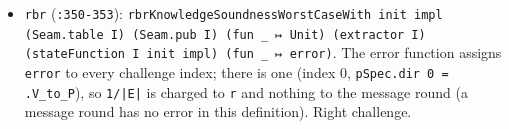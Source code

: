 \begin{itemize}
\item \texttt{rbr} (\texttt{:350-{}353}): \texttt{r\allowbreak{}b\allowbreak{}r\allowbreak{}K\allowbreak{}n\allowbreak{}o\allowbreak{}w\allowbreak{}l\allowbreak{}e\allowbreak{}d\allowbreak{}g\allowbreak{}e\allowbreak{}S\allowbreak{}o\allowbreak{}u\allowbreak{}n\allowbreak{}d\allowbreak{}n\allowbreak{}e\allowbreak{}s\allowbreak{}s\allowbreak{}W\allowbreak{}o\allowbreak{}r\allowbreak{}s\allowbreak{}t\allowbreak{}C\allowbreak{}a\allowbreak{}s\allowbreak{}e\allowbreak{}W\allowbreak{}i\allowbreak{}t\allowbreak{}h\allowbreak{} i\allowbreak{}n\allowbreak{}i\allowbreak{}t\allowbreak{} i\allowbreak{}m\allowbreak{}p\allowbreak{}l\allowbreak{} (\allowbreak{}S\allowbreak{}e\allowbreak{}a\allowbreak{}m\allowbreak{}.\allowbreak{}t\allowbreak{}a\allowbreak{}b\allowbreak{}l\allowbreak{}e\allowbreak{} I\allowbreak{})\allowbreak{} (\allowbreak{}S\allowbreak{}e\allowbreak{}a\allowbreak{}m\allowbreak{}.\allowbreak{}p\allowbreak{}u\allowbreak{}b\allowbreak{} I\allowbreak{})\allowbreak{} (\allowbreak{}f\allowbreak{}u\allowbreak{}n\allowbreak{} \_\allowbreak{} ↦\allowbreak{} U\allowbreak{}n\allowbreak{}i\allowbreak{}t\allowbreak{})\allowbreak{} (\allowbreak{}e\allowbreak{}x\allowbreak{}t\allowbreak{}r\allowbreak{}a\allowbreak{}c\allowbreak{}t\allowbreak{}o\allowbreak{}r\allowbreak{} I\allowbreak{})\allowbreak{} (\allowbreak{}s\allowbreak{}t\allowbreak{}a\allowbreak{}t\allowbreak{}e\allowbreak{}F\allowbreak{}u\allowbreak{}n\allowbreak{}c\allowbreak{}t\allowbreak{}i\allowbreak{}o\allowbreak{}n\allowbreak{} I\allowbreak{} i\allowbreak{}n\allowbreak{}i\allowbreak{}t\allowbreak{} i\allowbreak{}m\allowbreak{}p\allowbreak{}l\allowbreak{})\allowbreak{} (\allowbreak{}f\allowbreak{}u\allowbreak{}n\allowbreak{} \_\allowbreak{} ↦\allowbreak{} e\allowbreak{}r\allowbreak{}r\allowbreak{}o\allowbreak{}r\allowbreak{})}. The error function assigns \texttt{error} to every challenge index; there is one (index 0, \texttt{pSpec.\allowbreak{}dir 0 = .\allowbreak{}V\_\allowbreak{}to\_\allowbreak{}P}), so \texttt{1/\allowbreak{}|E|} is charged to \texttt{r} and nothing to the message round (a message round has no error in this definition). Right challenge.

\end{itemize}
